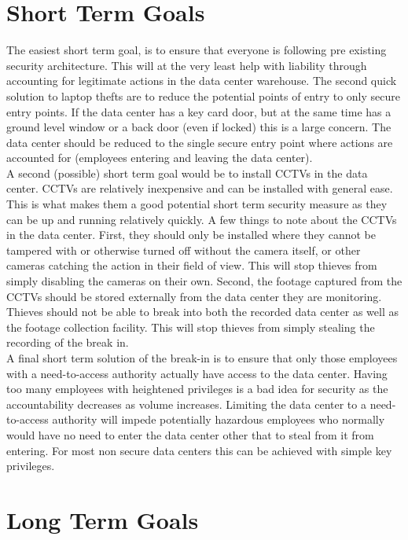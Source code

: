 \documentclass[paper=a4, fontsize=11pt]{scrartcl} %
\numberwithin{equation}{section} %
\numberwithin{figure}{section} %
\numberwithin{table}{section} %
\begin{document}
\section{Short Term Goals}

The easiest short term goal, is to ensure that everyone is following pre existing security architecture.
This will at the very least help with liability through accounting for legitimate actions in the
data center warehouse. The second quick solution to laptop thefts are to reduce the potential 
points of entry to only secure entry points. If the data center has a key card door, but at the same
time has a ground level window or a back door (even if locked) this is a large concern. The data center
should be reduced to the single secure entry point where actions are accounted for (employees entering
and leaving the data center).\\

A second (possible) short term goal would be to install CCTVs in the data center. CCTVs are relatively
inexpensive and can be installed with general ease. This is what makes them a good potential short term
security measure as they can be up and running relatively quickly. A few things to note about the CCTVs
in the data center. First, they should only be installed where they cannot be tampered with or otherwise
turned off without the camera itself, or other cameras catching the action in their field of view. This
will stop thieves from simply disabling the cameras on their own. Second, the footage captured from the
CCTVs should be stored externally from the data center they are monitoring. Thieves should not be able
to break into both the recorded data center as well as the footage collection facility. This will
stop thieves from simply stealing the recording of the break in.\\

A final short term solution of the break-in is to ensure that only those employees with a need-to-access
authority actually have access to the data center. Having too many employees with heightened privileges
is a bad idea for security as the accountability decreases as volume increases. Limiting the data
center to a need-to-access authority will impede potentially hazardous employees who normally would
have no need to enter the data center other that to steal from it from entering. For most non secure
data centers this can be achieved with simple key privileges.

\section{Long Term Goals}
\end{document}
